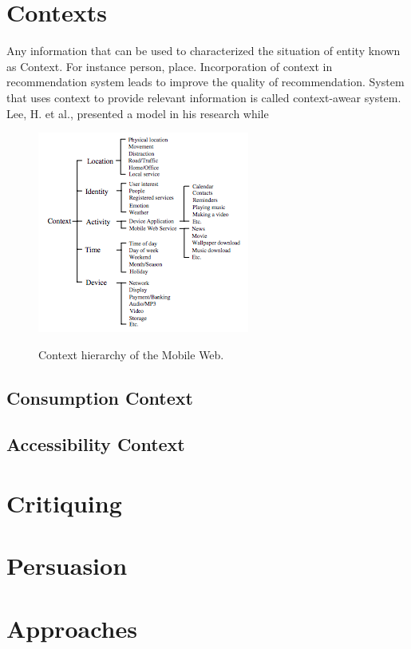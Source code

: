 \section{Contexts}

Any information that can be used to characterized the situation of entity known as Context. For instance person, place\cite{ abowd1999towards}.  Incorporation of context in recommendation system leads to improve the quality of recommendation. System that uses context to provide relevant information is called context-awear system.  Lee, H. et al., \cite{ lee2005context} presented a model in his research while 

\begin{figure}[h]
	\centering
	\includegraphics[width=1\linewidth]{figures/ch2_lee2005context.png}
	\caption{Context hierarchy of the Mobile Web.} 
	\cite{lee2005context}
	\label{fig:ch2_lee2005context}
\end{figure}
\subsection{Consumption Context}

\subsection{Accessibility Context}

\section{Critiquing}

\section{Persuasion}

\section{Approaches}